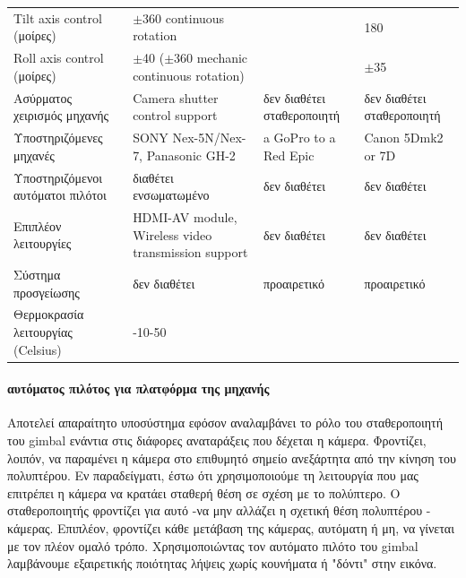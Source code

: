 \documentclass[a4paper, 12pt, twoside]{report}
\begin{document}
{{{{{{\begin{landscape}
\begin{longtable} { m{3cm} m{3.5cm} m{3.5cm} m{3.5cm}}
					Tilt axis control (μοίρες) & $\pm$360 continuous rotation & & 180\\
					Roll axis control (μοίρες) & $\pm$40 ($\pm$360 mechanic continuous rotation) & & $\pm$35\\
					\hdashline
					Ασύρματος χειρισμός μηχανής & Camera shutter control support & δεν διαθέτει σταθεροποιητή & δεν διαθέτει σταθεροποιητή\\
					\hdashline
					Υποστηριζόμενες μηχανές & SONY Nex-5N/Nex-7, Panasonic GH-2 & a GoPro to a Red Epic & Canon 5Dmk2 or 7D\\
					\hdashline
					Υποστηριζόμενοι αυτόματοι πιλότοι & διαθέτει ενσωματωμένο & δεν διαθέτει & δεν διαθέτει\\
					\hdashline
					Επιπλέον λειτουργίες & HDMI-AV module, Wireless video transmission support & δεν διαθέτει & δεν διαθέτει\\
					\hdashline
					Σύστημα προσγείωσης & δεν διαθέτει & προαιρετικό & προαιρετικό\\
					\hdashline
					Θερμοκρασία λειτουργίας (Celsius) & -10-50 & & \\
					\hline
				\end{longtable}
				\end{landscape}
				
			\paragraph{αυτόματος πιλότος για πλατφόρμα της μηχανής}{Αποτελεί απαραίτητο υποσύστημα εφόσον αναλαμβάνει το ρόλο του σταθεροποιητή του gimbal ενάντια στις διάφορες αναταράξεις που δέχεται η κάμερα. Φροντίζει, λοιπόν, να παραμένει η κάμερα στο επιθυμητό σημείο ανεξάρτητα από την κίνηση του πολυπτέρου. Εν παραδείγματι, έστω ότι χρησιμοποιούμε τη λειτουργία που μας επιτρέπει η κάμερα να κρατάει σταθερή θέση σε σχέση με το πολύπτερο. Ο σταθεροποιητής φροντίζει για αυτό -να μην αλλάζει η σχετική θέση πολυπτέρου - κάμερας. Επιπλέον, φροντίζει κάθε μετάβαση της κάμερας, αυτόματη ή μη, να γίνεται με τον πλέον ομαλό τρόπο. Χρησιμοποιώντας τον αυτόματο πιλότο του gimbal λαμβάνουμε εξαιρετικής ποιότητας λήψεις χωρίς κουνήματα ή "δόντι" στην εικόνα.
			}
			
			\begin{landscape}	
			\setlength\LTleft{0pt}            %
			\setlength\LTright{0pt}           %
	

\end{landscape}}}}}}}
\end{document}
